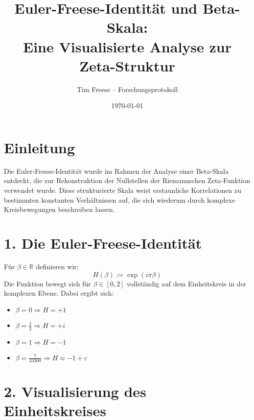\documentclass[a4paper,12pt]{article}
\title{Euler-Freese-Identität und Beta-Skala: \\
Eine Visualisierte Analyse zur Zeta-Struktur}
\author{Tim Freese – Forschungsprotokoll}
\date{\today}
\begin{document}
\maketitle

\section*{Einleitung}
Die Euler-Freese-Identität wurde im Rahmen der Analyse einer Beta-Skala entdeckt, die zur Rekonstruktion der Nullstellen der Riemannschen Zeta-Funktion verwendet wurde. Diese strukturierte Skala weist erstaunliche Korrelationen zu bestimmten konstanten Verhältnissen auf, die sich wiederum durch komplexe Kreisbewegungen beschreiben lassen.

\section*{1. Die Euler-Freese-Identität}
Für $\beta \in \mathbb{R}$ definieren wir:
\[
H(\beta) := \exp(i \pi \beta)
\]
Die Funktion bewegt sich für $\beta \in [0, 2]$ vollständig auf dem Einheitskreis in der komplexen Ebene. Dabei ergibt sich:

\begin{itemize}
    \item $\beta = 0 \Rightarrow H = +1$
    \item $\beta = \frac{1}{2} \Rightarrow H = +i$
    \item $\beta = 1 \Rightarrow H = -1$
    \item $\beta = \frac{7}{33300} \Rightarrow H \approx -1 + \varepsilon$
\end{itemize}

\section*{2. Visualisierung des Einheitskreises}

\begin{center}
\end{center}
\end{document}
